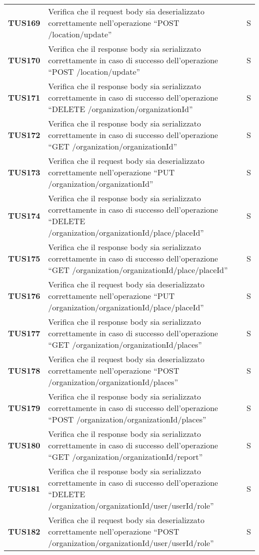 \documentclass[../../piano-di-qualifica.tex]{subfiles}
\begin{document}
\begin{longtable}[H]{>{\centering\bfseries}m{3cm} >{}m{10cm} >{\centering\arraybackslash}m{3cm}}

  TUS169 & Verifica che il request body sia deserializzato correttamente nell'operazione ``POST /location/update'' & S \\
  TUS170 & Verifica che il response body sia serializzato correttamente in caso di successo dell'operazione ``POST /location/update'' & S \\
  TUS171 & Verifica che il response body sia serializzato correttamente in caso di successo dell'operazione ``DELETE /organization/{organizationId}'' & S \\
  TUS172 & Verifica che il response body sia serializzato correttamente in caso di successo dell'operazione ``GET /organization/{organizationId}'' & S \\
  TUS173 & Verifica che il request body sia deserializzato correttamente nell'operazione ``PUT /organization/{organizationId}'' & S \\
  TUS174 & Verifica che il response body sia serializzato correttamente in caso di successo dell'operazione ``DELETE /organization/{organizationId}/place/{placeId}'' & S \\
  TUS175 & Verifica che il response body sia serializzato correttamente in caso di successo dell'operazione ``GET /organization/{organizationId}/place/{placeId}'' & S \\
  TUS176 & Verifica che il request body sia deserializzato correttamente nell'operazione ``PUT /organization/{organizationId}/place/{placeId}'' & S \\
  TUS177 & Verifica che il response body sia serializzato correttamente in caso di successo dell'operazione ``GET /organization/{organizationId}/places'' & S \\
  TUS178 & Verifica che il request body sia deserializzato correttamente nell'operazione ``POST /organization/{organizationId}/places'' & S \\
  TUS179 & Verifica che il response body sia serializzato correttamente in caso di successo dell'operazione ``POST /organization/{organizationId}/places'' & S \\
  TUS180 & Verifica che il response body sia serializzato correttamente in caso di successo dell'operazione ``GET /organization/{organizationId}/report'' & S \\
  TUS181 & Verifica che il response body sia serializzato correttamente in caso di successo dell'operazione ``DELETE /organization/{organizationId}/user/{userId}/role'' & S \\
  TUS182 & Verifica che il request body sia deserializzato correttamente nell'operazione ``POST /organization/{organizationId}/user/{userId}/role'' & S \\

\end{longtable}
\end{document}
